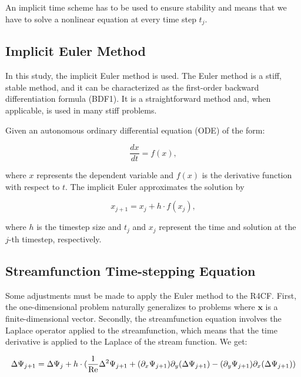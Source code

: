 An implicit time scheme has to be used to ensure stability and means that we
have to solve a nonlinear equation at every time step $t_j$. 

\subsection{Implicit Euler Method}

In this study, the implicit Euler method is used. The Euler method is a stiff,
stable method, and it can be characterized as the first-order backward
differentiation formula (BDF1). It is a straightforward method and, when
applicable, is used in many stiff problems.

Given an autonomous ordinary differential equation (ODE) of the form:

\begin{equation}
  \frac{{dx}}{{dt}} = f(x),
\end{equation}

where $x$ represents the dependent variable and
$f(x)$ is the derivative function with respect to $t$. The implicit Euler
approximates the solution by

\begin{equation}
  x_{j+1} = x_j + h \cdot f(x_j),
\end{equation}

where $h$ is the timestep size and
$t_j$ and $x_j$ represent the time and solution at the $j$-th timestep,
respectively.

\subsection{Streamfunction Time-stepping Equation}

Some adjustments must be made to apply the Euler method to the R4CF. First, the
one-dimensional problem naturally generalizes to problems where $\mathbf{x}$ is a
finite-dimensional vector. Secondly, the streamfunction equation involves the
Laplace operator applied to the streamfunction, which means that the time derivative is
applied to the Laplace of the stream function. We get:  

\begin{align}
  \Delta\Psi_{j+1} = \Delta\Psi_j + h \cdot (\frac{1}{\mathrm{Re}}\Delta^2 \Psi_{j+1} +
  (\partial_x \Psi_{j+1}) \partial_y(\Delta \Psi_{j+1}) -
  (\partial_y \Psi_{j+1}) \partial_x(\Delta \Psi_{j+1})) \label{eq:str_timestepping}
\end{align}


